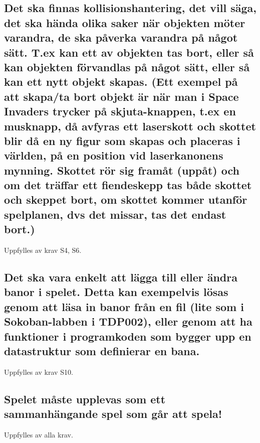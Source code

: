 \documentclass{TDP005mall}
\begin{document}
  \subsection{Det ska finnas kollisionshantering, det vill säga, det ska hända olika saker när objekten möter varandra, de ska påverka varandra på något sätt. T.ex kan ett av objekten tas bort, eller så kan objekten förvandlas på något sätt, eller så kan ett nytt objekt skapas. (Ett exempel på att skapa/ta bort objekt är när man i Space Invaders trycker på skjuta-knappen, t.ex en musknapp, då avfyras ett laserskott och skottet blir då en ny figur som skapas och placeras i världen, på en position vid laserkanonens mynning. Skottet rör sig framåt (uppåt) och om det träffar ett fiendeskepp tas både skottet och skeppet bort, om skottet kommer utanför spelplanen, dvs det missar, tas det endast bort.)}
  Uppfylles av krav S4, S6.
  \subsection{Det ska vara enkelt att lägga till eller ändra banor i spelet. Detta kan exempelvis lösas genom att läsa in banor från en fil (lite som i Sokoban-labben i TDP002), eller genom att ha funktioner i programkoden som bygger upp en datastruktur som definierar en bana.}
  Uppfylles av krav S10.
  \subsection{Spelet måste upplevas som ett sammanhängande spel som går att spela!}
  Uppfylles av alla krav.
\end{document}
